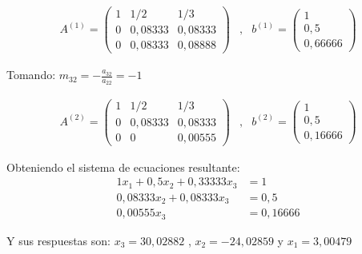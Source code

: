 \begin{equation*}
    \begin{matrix}
        A^{(1)}= \begin{pmatrix}
            1 & 1/2 & 1/3 \\
            0 & 0,08333 & 0,08333 \\
            0 & 0,08333 & 0,08888
        \end{pmatrix}
        & , &
        b^{(1)}=\begin{pmatrix}
            1 \\
            0,5 \\
            0,66666
        \end{pmatrix}
    \end{matrix}
\end{equation*}

Tomando: $m_{32}=-\frac{a_{32}}{a_{22}}=-1$

\begin{equation*}
    \begin{matrix}
        A^{(2)}= \begin{pmatrix}
            1 & 1/2 & 1/3 \\
            0 & 0,08333 & 0,08333 \\
            0 & 0 & 0,00555
        \end{pmatrix}
        & , &
        b^{(2)}=\begin{pmatrix}
            1 \\
            0,5 \\
            0,16666
        \end{pmatrix}
    \end{matrix}
\end{equation*}

Obteniendo el sistema de ecuaciones resultante:
\begin{align*}
    1x_1+0,5x_2+0,33333x_3 &= 1 \\
    0,08333x_2+0,08333x_3 &= 0,5 \\
    0,00555x_3 &= 0,16666
\end{align*}

Y sus respuestas son: $x_3=30,02882$ , $x_2=-24,02859$ y $x_1=3,00479$\\

